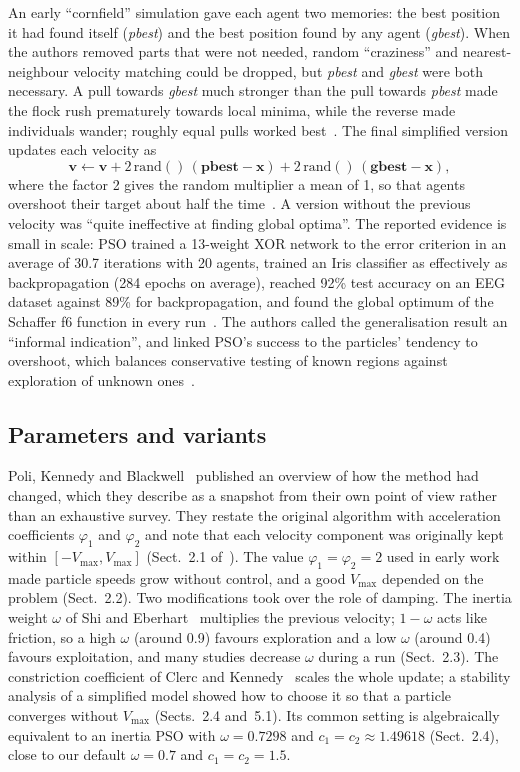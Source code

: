 \documentclass[11pt,a4paper]{article}
\newcommand{\Vmax}{V_{\max}}
\newcommand{\tn}[1]{\textit{#1}}
\begin{document}
An early ``cornfield'' simulation gave each agent two memories: the best position it had found itself (\tn{pbest}) and the best position found by any agent (\tn{gbest}). When the authors removed parts that were not needed, random ``craziness'' and nearest-neighbour velocity matching could be dropped, but \tn{pbest} and \tn{gbest} were both necessary. A pull towards \tn{gbest} much stronger than the pull towards \tn{pbest} made the flock rush prematurely towards local minima, while the reverse made individuals wander; roughly equal pulls worked best~\cite[p.~1945]{kennedy1995}. The final simplified version updates each velocity as
\begin{equation}
\mathbf{v}\leftarrow\mathbf{v}+2\,\mathrm{rand}()\,(\mathbf{pbest}-\mathbf{x})+2\,\mathrm{rand}()\,(\mathbf{gbest}-\mathbf{x}),
\end{equation}
where the factor 2 gives the random multiplier a mean of 1, so that agents overshoot their target about half the time~\cite[p.~1946]{kennedy1995}. A version without the previous velocity was ``quite ineffective at finding global optima''. The reported evidence is small in scale: PSO trained a 13-weight XOR network to the error criterion in an average of 30.7 iterations with 20 agents, trained an Iris classifier as effectively as backpropagation (284 epochs on average), reached 92\% test accuracy on an EEG dataset against 89\% for backpropagation, and found the global optimum of the Schaffer f6 function in every run~\cite[pp.~1945, 1947]{kennedy1995}. The authors called the generalisation result an ``informal indication'', and linked PSO's success to the particles' tendency to overshoot, which balances conservative testing of known regions against exploration of unknown ones~\cite[p.~1947]{kennedy1995}.

\subsection{Parameters and variants}
Poli, Kennedy and Blackwell~\cite{poli2007} published an overview of how the method had changed, which they describe as a snapshot from their own point of view rather than an exhaustive survey. They restate the original algorithm with acceleration coefficients $\varphi_1$ and $\varphi_2$ and note that each velocity component was originally kept within $[-\Vmax,\Vmax]$ (Sect.~2.1 of~\cite{poli2007}). The value $\varphi_1=\varphi_2=2$ used in early work made particle speeds grow without control, and a good $\Vmax$ depended on the problem (Sect.~2.2). Two modifications took over the role of damping. The inertia weight $\omega$ of Shi and Eberhart~\cite{shi1998} multiplies the previous velocity; $1-\omega$ acts like friction, so a high $\omega$ (around 0.9) favours exploration and a low $\omega$ (around 0.4) favours exploitation, and many studies decrease $\omega$ during a run (Sect.~2.3). The constriction coefficient of Clerc and Kennedy~\cite{clerc2002} scales the whole update; a stability analysis of a simplified model showed how to choose it so that a particle converges without $\Vmax$ (Sects.~2.4 and~5.1). Its common setting is algebraically equivalent to an inertia PSO with $\omega=0.7298$ and $c_1=c_2\approx1.49618$ (Sect.~2.4), close to our default $\omega=0.7$ and $c_1=c_2=1.5$.
\end{document}
